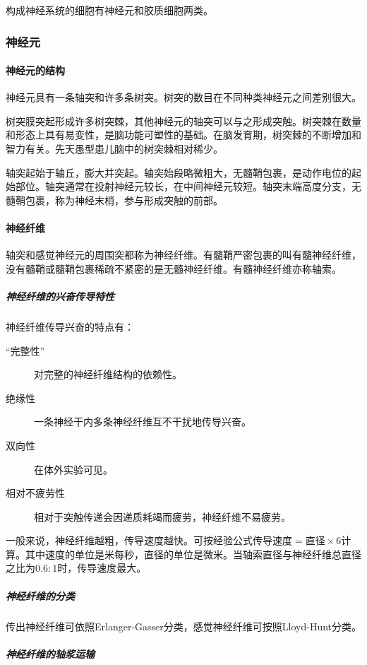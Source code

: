 构成神经系统的细胞有神经元和胶质细胞两类。

\subsubsection{神经元}

\paragraph{神经元的结构}

神经元具有一条轴突和许多条树突。树突的数目在不同种类神经元之间差别很大。

树突膜突起形成许多树突棘，其他神经元的轴突可以与之形成突触。树突棘在数量和形态上具有易变性，是脑功能可塑性的基础。在脑发育期，树突棘的不断增加和智力有关。先天愚型患儿脑中的树突棘相对稀少。

轴突起始于轴丘，膨大并突起。轴突始段略微粗大，无髓鞘包裹，是动作电位的起始部位。轴突通常在投射神经元较长，在中间神经元较短。轴突末端高度分支，无髓鞘包裹，称为神经末梢，参与形成突触的前部。

\paragraph{神经纤维}

轴突和感觉神经元的周围突都称为神经纤维。有髓鞘严密包裹的叫有髓神经纤维，没有髓鞘或髓鞘包裹稀疏不紧密的是无髓神经纤维。有髓神经纤维亦称轴索。

\subparagraph{神经纤维的兴奋传导特性}

神经纤维传导兴奋的特点有：
\begin{description}
	\item[“完整性”] 对完整的神经纤维结构的依赖性。
	\item[绝缘性] 一条神经干内多条神经纤维互不干扰地传导兴奋。
	\item[双向性] 在体外实验可见。
	\item[相对不疲劳性] 相对于突触传递会因递质耗竭而疲劳，神经纤维不易疲劳。
\end{description}

一般来说，神经纤维越粗，传导速度越快。可按经验公式$\text{传导速度}=\text{直径}\times 6$计算。其中速度的单位是米每秒，直径的单位是微米。当轴索直径与神经纤维总直径之比为$0.6:1$时，传导速度最大。

\subparagraph{神经纤维的分类}

传出神经纤维可依照Erlanger-Gasser分类，感觉神经纤维可按照Lloyd-Hunt分类。

\subparagraph{神经纤维的轴浆运输}

